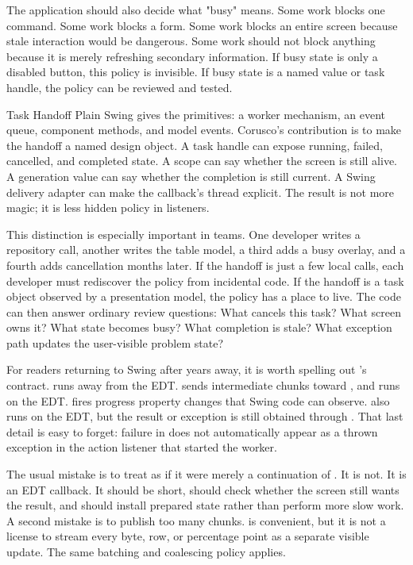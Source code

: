 The application should also decide what "busy" means. Some work blocks one command. Some work blocks a form. Some work blocks an entire screen because stale interaction would be dangerous. Some work should not block anything because it is merely refreshing secondary information. If busy state is only a disabled button, this policy is invisible. If busy state is a named value or task handle, the policy can be reviewed and tested.

\begin{coruscobox}{Task Handoff}
Plain Swing gives the primitives: a worker mechanism, an event queue, component methods, and model events. Corusco's contribution is to make the handoff a named design object. A task handle can expose running, failed, cancelled, and completed state. A scope can say whether the screen is still alive. A generation value can say whether the completion is still current. A Swing delivery adapter can make the callback's thread explicit. The result is not more magic; it is less hidden policy in listeners.
\end{coruscobox}

This distinction is especially important in teams. One developer writes a repository call, another writes the table model, a third adds a busy overlay, and a fourth adds cancellation months later. If the handoff is just a few local  calls, each developer must rediscover the policy from incidental code. If the handoff is a task object observed by a presentation model, the policy has a place to live. The code can then answer ordinary review questions: What cancels this task? What screen owns it? What state becomes busy? What completion is stale? What exception path updates the user-visible problem state?

For readers returning to Swing after years away, it is worth spelling out 's contract.  runs away from the EDT.  sends intermediate chunks toward , and  runs on the EDT.  fires progress property changes that Swing code can observe.  also runs on the EDT, but the result or exception is still obtained through . That last detail is easy to forget: failure in  does not automatically appear as a thrown exception in the action listener that started the worker.

The usual  mistake is to treat  as if it were merely a continuation of . It is not. It is an EDT callback. It should be short, should check whether the screen still wants the result, and should install prepared state rather than perform more slow work. A second mistake is to publish too many chunks.  is convenient, but it is not a license to stream every byte, row, or percentage point as a separate visible update. The same batching and coalescing policy applies.

